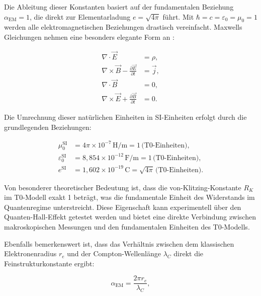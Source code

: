 \documentclass[twocolumn,aps,prl]{revtex4-2}
\begin{document}
	Die Ableitung dieser Konstanten basiert auf der fundamentalen Beziehung $\alpha_{\text{EM}} = 1$, die direkt zur Elementarladung $e = \sqrt{4\pi}$ führt. Mit $\hbar = c = \varepsilon_0 = \mu_0 = 1$ werden alle elektromagnetischen Beziehungen drastisch vereinfacht. Maxwells Gleichungen nehmen eine besonders elegante Form an \cite{Feynman1985}:
	
	\begin{align}
		\nabla \cdot \vec{E} &= \rho, \label{eq:detailed_gauss} \\
		\nabla \times \vec{B} - \frac{\partial \vec{E}}{\partial t} &= \vec{j}, \label{eq:detailed_ampere} \\
		\nabla \cdot \vec{B} &= 0, \label{eq:detailed_gauss_mag} \\
		\nabla \times \vec{E} + \frac{\partial \vec{B}}{\partial t} &= 0. \label{eq:detailed_faraday}
	\end{align}
	
	Die Umrechnung dieser natürlichen Einheiten in SI-Einheiten erfolgt durch die grundlegenden Beziehungen:
	
	\begin{align}
		\mu_0^{\text{SI}} &= 4\pi \times 10^{-7} \, \text{H/m} = 1 \, \text{(T0-Einheiten)}, \label{eq:mu0_conversion} \\
		\varepsilon_0^{\text{SI}} &= 8,854 \times 10^{-12} \, \text{F/m} = 1 \, \text{(T0-Einheiten)}, \label{eq:epsilon0_conversion} \\
		e^{\text{SI}} &= 1,602 \times 10^{-19} \, \text{C} = \sqrt{4\pi} \, \text{(T0-Einheiten)}. \label{eq:e_conversion}
	\end{align}
	
	Von besonderer theoretischer Bedeutung ist, dass die von-Klitzing-Konstante $R_K$ im T0-Modell exakt 1 beträgt, was die fundamentale Einheit des Widerstands im Quantenregime unterstreicht. Diese Eigenschaft kann experimentell über den Quanten-Hall-Effekt getestet werden \cite{pascher_alpha_2025} und bietet eine direkte Verbindung zwischen makroskopischen Messungen und den fundamentalen Einheiten des T0-Modells.
	
	Ebenfalls bemerkenswert ist, dass das Verhältnis zwischen dem klassischen Elektronenradius $r_e$ und der Compton-Wellenlänge $\lambda_C$ direkt die Feinstrukturkonstante ergibt:
	
	\begin{equation}
		\alpha_{\text{EM}} = \frac{2\pi r_e}{\lambda_C}, \label{eq:detailed_alpha_relation}
	\end{equation}
	
\end{document}
